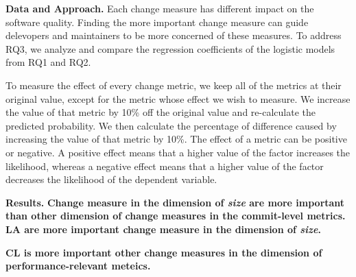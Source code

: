 


\textbf{Data and Approach.}
Each change measure has different impact on the software quality. Finding the more important change measure can guide delevopers and maintainers to be more concerned of these measures. To address RQ3, we analyze and compare the regression coefficients of the logistic models from RQ1 and RQ2. 

To measure the effect of every change metric, we keep all of the metrics at their original value, except for the metric whose effect we wish to measure. We increase the value of that metric by 10\% off the original value and re-calculate the predicted probability. We then calculate the percentage of difference caused by increasing the value of that metric by 10\%. The effect of a metric can be positive or negative. A positive effect means that a higher value of the factor increases the likelihood, whereas a negative effect means that a higher value of the factor decreases the likelihood of the dependent variable.

\textbf{Results.} \textbf{Change measure in the dimension of \emph{size} are more important than other dimension of change measures in the commit-level metrics. LA are more important change measure in the dimension of \emph{size}.}

\textbf{CL is more important other change measures in the dimension of performance-relevant meteics.}





